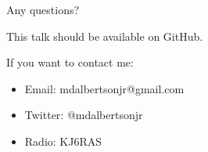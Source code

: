 \documentclass{beamer}
\begin{document}
\begin{frame} %

\begin{center}
   Any questions?
\end{center}

This talk should be available on GitHub.

If you want to contact me:
\begin{itemize}
\item Email: mdalbertsonjr@gmail.com
\item Twitter: @mdalbertsonjr
\item Radio: KJ6RAS
\end{itemize}

\end{frame}
\end{document}
